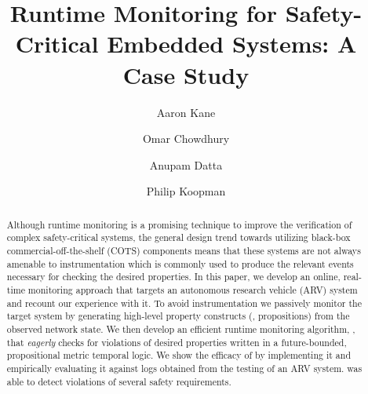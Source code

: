 \documentclass[]{./llncs}
\begin{document}
\title{Runtime Monitoring for Safety-Critical Embedded Systems: A Case Study}


\author{Aaron Kane \and Omar Chowdhury \and Anupam Datta \and Philip Koopman}



\maketitle



\begin{abstract}

Although runtime monitoring is a promising technique to improve the verification of complex safety-critical systems, 
the general design trend towards utilizing black-box commercial-off-the-shelf (COTS) components means that these systems 
are not always amenable to instrumentation which is commonly used to produce the relevant events necessary for checking 
the desired properties. In this paper, we develop an online, real-time monitoring approach that targets an autonomous research 
vehicle (ARV) system and recount our experience with it. To avoid instrumentation we passively monitor the target system by 
generating high-level property constructs (\ie, propositions) from the observed network state. 
We then develop an efficient runtime monitoring algorithm, \monitor, that \emph{eagerly} checks for violations of desired properties 
written in a future-bounded, propositional metric temporal logic. 
We show the efficacy of \monitor by implementing it and empirically evaluating it against logs obtained from 
the testing of an ARV system. \monitor was able to detect violations of several safety requirements.




\end{abstract}
\end{document}
